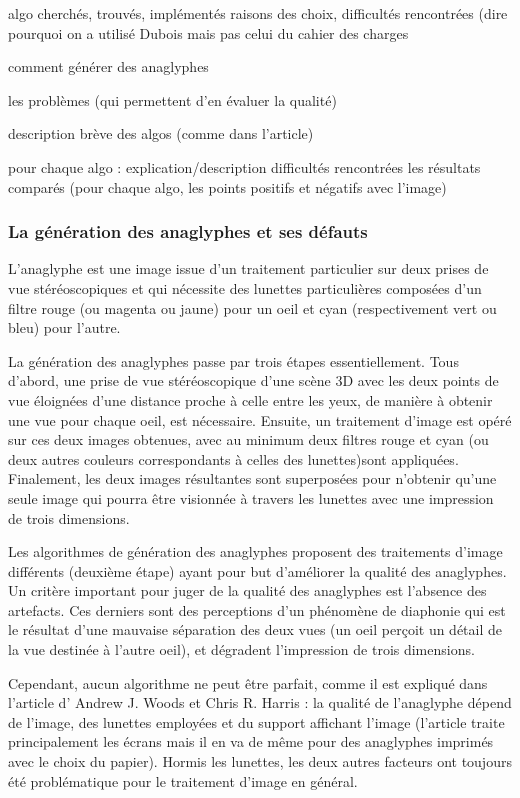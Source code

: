 algo cherchés, trouvés, implémentés
  raisons des choix, difficultés rencontrées
  (dire pourquoi on a utilisé Dubois mais pas celui du cahier des charges


comment générer des anaglyphes 

les problèmes (qui permettent d'en évaluer la qualité)

description brève des algos (comme dans l'article)

pour chaque algo : 
	explication/description
	difficultés rencontrées
 	les résultats comparés (pour chaque algo, les points positifs et négatifs avec l'image)

\subsubsection{La génération des anaglyphes et ses défauts}
	L'anaglyphe est une image issue d'un traitement particulier sur deux prises de vue stéréoscopiques et qui nécessite des lunettes particulières composées d'un filtre rouge (ou magenta ou jaune) pour un oeil et cyan (respectivement vert ou bleu) pour l'autre. 
	
	La génération des anaglyphes passe par trois étapes essentiellement. Tous d'abord, une prise de vue stéréoscopique d'une scène 3D avec les deux points de vue éloignées d'une distance proche à celle entre les yeux, de manière à obtenir une vue pour chaque oeil, est nécessaire. Ensuite, un traitement d'image est opéré sur ces deux images obtenues, avec au minimum deux filtres rouge et cyan (ou deux autres couleurs correspondants à celles des lunettes)sont appliquées. Finalement, les deux images résultantes sont superposées pour n'obtenir qu'une seule image qui pourra être visionnée à travers les lunettes avec une impression de trois dimensions.
	
	Les algorithmes de génération des anaglyphes proposent des traitements d'image différents (deuxième étape) ayant pour but d'améliorer la qualité des anaglyphes. Un critère important pour juger de la qualité des anaglyphes est l'absence des artefacts. Ces derniers sont des perceptions d'un phénomène de diaphonie qui est le résultat d'une mauvaise séparation des deux vues (un oeil perçoit un détail de la vue destinée à l'autre oeil), et dégradent l'impression de trois dimensions. %

	Cependant, aucun algorithme ne peut être parfait, comme il est expliqué dans l'article d' Andrew J. Woods et Chris R. Harris \cite{anaglypheDefaut}  : la qualité de l'anaglyphe dépend de l'image, des lunettes employées et du support affichant l'image (l'article traite principalement les écrans mais il en va de même pour des anaglyphes imprimés avec le choix du papier). Hormis les lunettes, les deux autres facteurs ont toujours été problématique pour le traitement d'image en général.  
	
